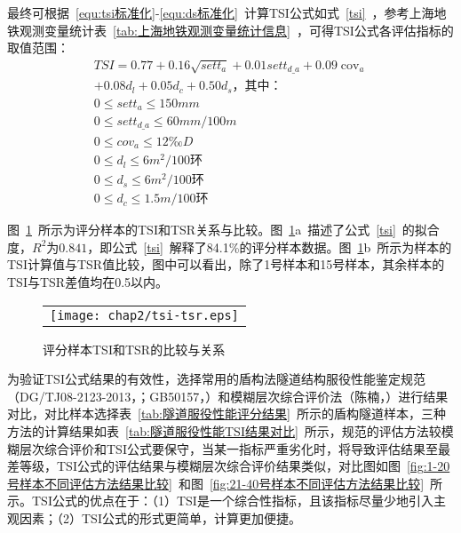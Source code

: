 最终可根据~\ref{equ:tsi标准化}-\ref{equ:ds标准化}~计算TSI公式如式~\ref{tsi}~，参考上海地铁观测变量统计表~\ref{tab:上海地铁观测变量统计信息}~，可得TSI公式各评估指标的取值范围：
\begin{gather}
  \label{tsi}
  TSI=0.77+0.16\sqrt{set{{t}_{a}}}+0.01set{{t}_{d\_a}}+0.09{{\operatorname{cov}}_{a}} \\ 
  +0.08{{d}_{l}}+0.05{{d}_{c}}+0.50{{d}_{s}}\text{，其中：}  \nonumber \\
  0\le set{{t}_{a}}\le 150mm \nonumber \\
  0\le set{{t}_{d\_a}}\le 60mm/100m \nonumber \\
  0\le cov_a\le 12‰D \nonumber \\
  0\le d_l\le 6m^2/100\text{环} \nonumber \\
  0\le d_s\le 6m^2/100\text{环} \nonumber \\
  0\le d_c\le 1.5m/100\text{环} \nonumber
\end{gather}

图~\ref{fig:TSI和TSR的比较与关系}~所示为评分样本的TSI和TSR关系与比较。图~\ref{fig:TSI和TSR的比较与关系}a~描述了公式~\ref{tsi}~的拟合度，$R^2$为$0.841$，即公式~\ref{tsi}~解释了84.1\%的评分样本数据。图~\ref{fig:TSI和TSR的比较与关系}b~所示为样本的TSI计算值与TSR值比较，图中可以看出，除了1号样本和15号样本，其余样本的TSI与TSR差值均在0.5以内。

\begin{figure}[htb!] 
    \centering 
    \begin{tabular}{c} 
        \texttt{[image: chap2/tsi-tsr.eps]} \\ 
    \end{tabular}
    \caption{评分样本TSI和TSR的比较与关系} 
    \label{fig:TSI和TSR的比较与关系} 
\end{figure}

为验证TSI公式结果的有效性，选择常用的盾构法隧道结构服役性能鉴定规范（DG/TJ08-2123-2013，\citeyear{DGTJ0821232013}；GB50157，\citeyear{GB501572013}）和模糊层次综合评价法（陈楠，\citeyear{陈楠2017考虑发展趋势与指标关联的隧道结构健康评估方法研究}）进行结果对比，对比样本选择表~\ref{tab:隧道服役性能评分结果}~所示的盾构隧道样本，三种方法的计算结果如表~\ref{tab:隧道服役性能TSI结果对比}~所示，规范的评估方法较模糊层次综合评价和TSI公式要保守，当某一指标严重劣化时，将导致评估结果至最差等级，TSI公式的评估结果与模糊层次综合评价结果类似，对比图如图~\ref{fig:1-20号样本不同评估方法结果比较}~和图~\ref{fig:21-40号样本不同评估方法结果比较}~所示。TSI公式的优点在于：（1）TSI是一个综合性指标，且该指标尽量少地引入主观因素；（2）TSI公式的形式更简单，计算更加便捷。

